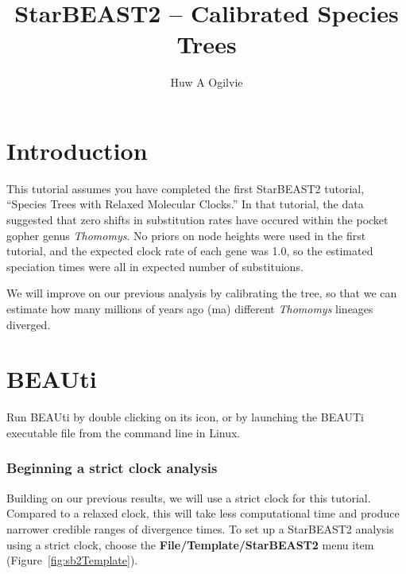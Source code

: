 \documentclass{article}
\begin{document}
\title{StarBEAST2 -- Calibrated Species Trees}

\author{Huw A Ogilvie}

\maketitle

\section{Introduction}

This tutorial assumes you have completed the first StarBEAST2 tutorial,
``Species Trees with Relaxed Molecular Clocks.'' In that tutorial, the data
suggested that zero shifts in substitution rates have occured within the
pocket gopher genus \textit{Thomomys}. No priors on node heights were used in
the first tutorial, and the expected clock rate of each gene was 1.0, so the
estimated speciation times were all in expected number of substituions.

We will improve on our previous analysis by calibrating the tree, so that we can estimate
how many millions of years ago (ma) different \textit{Thomomys} lineages
diverged.

\section{BEAUti}

Run BEAUti by double clicking on its icon, or by launching the BEAUTi executable
file from the command line in Linux.

\subsubsection*{Beginning a strict clock analysis}

Building on our previous results, we will use a strict clock for this
tutorial. Compared to a relaxed clock, this will take less computational time
and produce narrower credible ranges of divergence times. To set up a StarBEAST2
analysis using a strict clock, choose the
\textbf{File/Template/StarBEAST2} menu item
(Figure~\ref{fig:sb2Template}).
\end{document}
